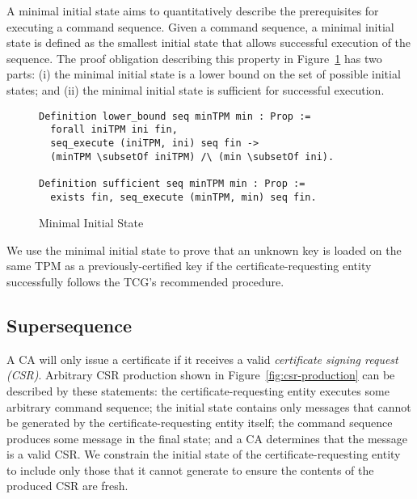 \documentclass[runningheads]{llncs}
\begin{document}
A minimal initial state aims to quantitatively describe the
prerequisites for executing a command sequence.  Given a command
sequence, a minimal initial state is defined as the smallest initial
state that allows successful execution of the sequence. The proof
obligation describing this property in
Figure~\ref{fig:minimal-initial-state} has two parts: (i) the minimal
initial state is a lower bound on the set of possible initial states;
and (ii) the minimal initial state is sufficient for successful
execution.

\begin{figure}[hbtp]
\vspace{-\medskipamount}
\vspace{-\medskipamount}
\begin{lstlisting}[language=Coq]
Definition lower_bound seq minTPM min : Prop :=
  forall iniTPM ini fin,
  seq_execute (iniTPM, ini) seq fin ->
  (minTPM \subsetOf iniTPM) /\ (min \subsetOf ini).

Definition sufficient seq minTPM min : Prop :=
  exists fin, seq_execute (minTPM, min) seq fin.
\end{lstlisting}
\caption{Minimal Initial State}
\label{fig:minimal-initial-state}
\end{figure}

We use the minimal initial state to prove that an unknown key is
loaded on the same TPM as a previously-certified key if the
certificate-requesting entity successfully follows the TCG's
recommended procedure.  

\subsection{Supersequence}

A CA will only issue a certificate if it receives a valid \emph{certificate
signing request (CSR)}.  Arbitrary CSR production shown in
Figure~\ref{fig:csr-production} can be described by these statements: 
the certificate-requesting
entity executes some arbitrary command sequence; the initial state
contains only messages that cannot be generated by the certificate-requesting 
entity itself; 
the command sequence produces some message in the final state; and a
CA determines that the message is a valid CSR.
We constrain the initial state of the certificate-requesting entity to
include only those that it cannot generate to ensure the contents of
the produced CSR are fresh. 
\end{document}
